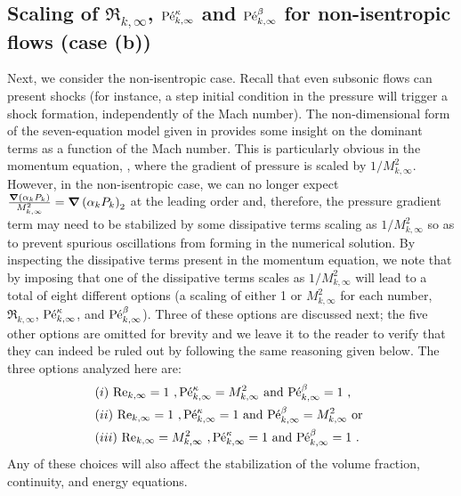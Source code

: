 \subsection{Scaling of $\Re_{k,\infty}$, $\textrm{P\'e}_{k,\infty}^\kappa$ and $\textrm{P\'e}_{k,\infty}^\beta$ for non-isentropic flows (case (b))}\label{eq:non_isent_flows}
%
Next, we consider the non-isentropic case. Recall that even subsonic flows can present shocks (for instance, 
a step initial condition in the pressure will trigger a shock formation, independently of the Mach number). 
The non-dimensional form of the seven-equation model given in  provides some insight on the 
dominant terms as a function of the Mach number. This is particularly obvious in the momentum equation, , 
where the gradient of pressure is scaled by $1/M_{k,\infty}^2$. However, in the non-isentropic case, we can no longer 
expect $\frac{\boldsymbol\nabla \left( \alpha_k P_k \right)}{M_{k,\infty}^2}=\boldsymbol\nabla \left( \alpha_k P_k \right)_2$ at the leading order and, 
therefore, the pressure gradient term may need to be stabilized by 
some dissipative terms scaling as $1/M_{k,\infty}^2$ so as to prevent spurious oscillations from forming in the numerical solution. 
By inspecting the dissipative terms present in the momentum equation, we note that by imposing that one of the dissipative terms 
scales as $1/M_{k,\infty}^2$ will lead to a total of eight different options (a scaling of either 1 or $M^2_{k,\infty}$ for each number, 
$\Re_{k,\infty}$, $\textrm{P\'e}_{k,\infty}^\kappa$, and $\textrm{P\'e}_{k,\infty}^\beta$). Three of these options are discussed next; the five other 
options are omitted for brevity and we leave it to the reader to verify that they can indeed be ruled out by following the same reasoning given below. 
The three options analyzed here are:
%
\begin{align}
&(i) \ \textrm{Re}_{k,\infty} = 1 \ , \textrm{P\'e}_{k,\infty}^\kappa = M_{k,\infty}^2 \text{ and } \textrm{P\'e}_{k,\infty}^\beta = 1 \ , \nonumber \\
&(ii) \ \textrm{Re}_{k,\infty} = 1 \ , \textrm{P\'e}_{k,\infty}^\kappa = 1 \text{ and } \textrm{P\'e}_{k,\infty}^\beta = M_{k,\infty}^2 \text{ or } \nonumber \\
&(iii) \ \textrm{Re}_{k,\infty} = M_{k,\infty}^2 \ , \textrm{P\'e}_{k,\infty}^\kappa = 1 \text{ and } \textrm{P\'e}_{k,\infty}^\beta = 1 \ . \nonumber
\end{align}
%
Any of these choices will also affect the stabilization of the volume fraction, continuity, and energy equations. 

